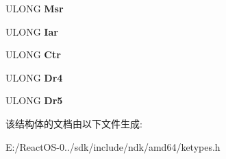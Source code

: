 \begin{DoxyCompactItemize}
\item 
\mbox{\label{struct___k_t_r_a_p___f_r_a_m_e_a34f28a1ca765c6ba33054c9907aa3d2c}} 
U\+L\+O\+NG {\bfseries Msr}
\item 
\mbox{\label{struct___k_t_r_a_p___f_r_a_m_e_a705c5fbd307aff798f650f26cb280ef4}} 
U\+L\+O\+NG {\bfseries Iar}
\item 
\mbox{\label{struct___k_t_r_a_p___f_r_a_m_e_a1314c5e863a74ffe569e6c747b77e59a}} 
U\+L\+O\+NG {\bfseries Ctr}
\item 
\mbox{\label{struct___k_t_r_a_p___f_r_a_m_e_a1494460e60f681107dd49ae4b190418c}} 
U\+L\+O\+NG {\bfseries Dr4}
\item 
\mbox{\label{struct___k_t_r_a_p___f_r_a_m_e_aa9cfcd56afbe5c8b70572d8eda25f15d}} 
U\+L\+O\+NG {\bfseries Dr5}
\end{DoxyCompactItemize}


该结构体的文档由以下文件生成\+:\begin{DoxyCompactItemize}
\item 
E\+:/\+React\+O\+S-\/0../sdk/include/ndk/amd64/ketypes.\+h\end{DoxyCompactItemize}
